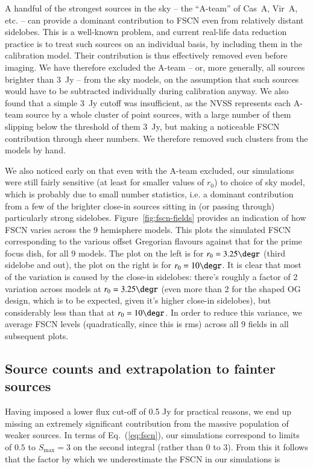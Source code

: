 \documentclass{aa}
\begin{document}
A handful of the strongest sources in the sky -- the ``A-team'' of  Cas~A, Vir~A, etc. -- can provide a dominant contribution to FSCN even from relatively distant sidelobes. This is a well-known problem, and current real-life data reduction practice is to treat such sources on an individual basis, by including them in the calibration model. Their contribution is thus effectively removed even before imaging. We have therefore excluded the A-team -- or, more generally, all sources brighter than 3~Jy -- from the sky models, on the assumption that such sources would have to be subtracted individually during calibration anyway. We also found that a simple 3~Jy cutoff was insufficient, as the NVSS represents each A-team source by a whole cluster of point sources, with a large number of them slipping below the threshold of them 3~Jy, but making a noticeable FSCN contribution through sheer numbers. We therefore removed such clusters from the models by hand.

We also noticed early on that even with the A-team excluded, our simulations were still fairly sensitive (at least for smaller values of $r_0$) to choice of sky model, which is probably due to small number statistics, i.e. a dominant contribution from a few of the brighter close-in sources sitting in (or passing through) particularly strong sidelobes. Figure~\ref{fig:fscn-fields} provides an indication of how FSCN varies across the 9 hemisphere models. This plots the simulated FSCN corresponding to the various offset Gregorian flavours against that for the prime focus dish, for all 9 models. The plot on the left is for $r_0=3.25\degr$ (third sidelobe and out), the plot on the right is for $r_0=10\degr$. It is clear that most of the variation is caused by the close-in sidelobes: there's roughly a factor of 2 variation across models at $r_0=3.25\degr$ (even more than 2 for the shaped OG design, which is to be expected, given it's higher close-in sidelobes), but considerably less than that at $r_0=10\degr$. In 
order to reduce this variance, we average FSCN levels (quadratically, since this is rms) across all 9 fields in all subsequent plots.

\subsection{Source counts and extrapolation to fainter sources}
\label{sec:source-counts}
Having imposed a lower flux cut-off of 0.5 Jy for practical reasons, we end up missing an extremely significant contribution from the massive population of weaker sources. In terms of Eq.~(\ref{eq:fscn}), our simulations correspond to limits of $0.5$ to $S_\mathrm{max}=3$ on the second integral (rather than $0$ to $3$). From this it follows that the factor by which we underestimate the FSCN in our simulations is
\end{document}
